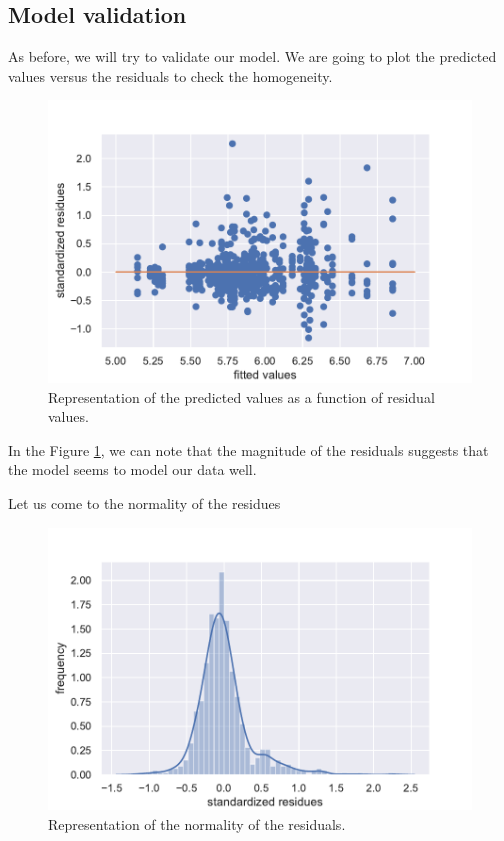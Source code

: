 \documentclass{article}
\begin{document}
\subsection{Model validation}
As before, we will try to validate our model.
We are going to plot the predicted values versus the residuals to check the homogeneity.
\begin{figure}[H]
    \centering
    \includegraphics[scale=.65]{./images/homo_mod2.pdf}
    \caption{Representation of the predicted values as a function of 
residual values.}
    \label{fig:homo_mod2}
\end{figure}

In the Figure \ref{fig:homo_mod2}, we can note that the magnitude of the residuals suggests that the model seems to model our data well.

Let us come to the normality of the residues
\begin{figure}[H]
    \centering
    \includegraphics[scale=.65]{./images/resid_norm_m2.pdf}
    \caption{Representation of the normality of the residuals.}
    \label{fig:residm2}
\end{figure}
\end{document}
